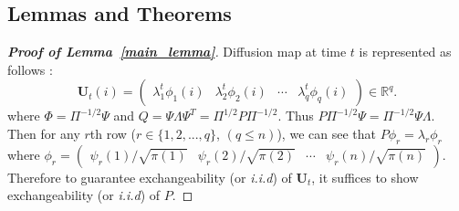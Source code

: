 \documentclass[11pt]{article}
\theoremstyle{definition}
\begin{document}
\subsection{Lemmas and Theorems}
\label{ssec:proof}

\begin{proof}[\textbf{Proof of Lemma~\ref{main_lemma}}]
	Diffusion map at time $t$ is represented as follows :
	\begin{equation}
	\mathbf{U}_{t}(i) = \begin{pmatrix} \lambda^{t}_{1} \phi_{1}(i) & \lambda^{t}_{2} \phi_{2} (i)  & \cdots & \lambda^{t}_{q} \phi_{q}(i) \end{pmatrix} \in \mathbb{R}^{q}.
	\end{equation}
	where $\Phi = \Pi^{-1/2}\Psi$ and $Q= \Psi \Lambda \Psi^{T} = \Pi^{1/2} P \Pi^{-1/2}$. 
	Thus $P \Pi^{-1/2} \Psi = \Pi^{-1/2} \Psi \Lambda$. 
	Then for any $r$th row ($r \in \{1,2, ... , q \}$, $(q \leq n)$), we can see that $P \phi_{r} = \lambda_{r} \phi_{r}$  where $\phi_{r} = \begin{pmatrix}  \psi_{r}(1) / \sqrt{\pi(1)} &  \psi_{r}(2) /  \sqrt{\pi(2)} & \cdots & \psi_{r}(n) /  \sqrt{\pi(n)}  \end{pmatrix}$.
	Therefore to guarantee exchangeability (or \textit{i.i.d}) of $\mathbf{U}_{t}$, it suffices to show exchangeability (or \textit{i.i.d}) of $P$.
	

\end{proof}
\end{document}
